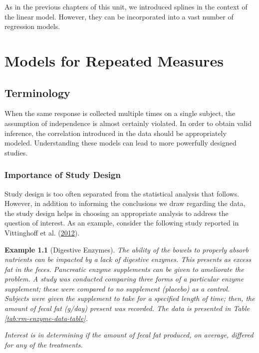 \documentclass[
]{book}
\theoremstyle{plain}
\theoremstyle{mydefn}
\theoremstyle{myexmpl}
\newtheorem{example}{Example}[chapter]
\theoremstyle{remark}
\begin{document}
As in the previous chapters of this unit, we introduced splines in the context of the linear model. However, they can be incorporated into a vast number of regression models.

\hypertarget{part-models-for-repeated-measures}{%
\part{Models for Repeated Measures}\label{part-models-for-repeated-measures}}

\hypertarget{rm-terminology}{%
\chapter{Terminology}\label{rm-terminology}}

When the same response is collected multiple times on a single subject, the assumption of independence is almost certainly violated. In order to obtain valid inference, the correlation introduced in the data should be appropriately modeled. Understanding these models can lead to more powerfully designed studies.

\hypertarget{importance-of-study-design}{%
\section{Importance of Study Design}\label{importance-of-study-design}}

Study design is too often separated from the statistical analysis that follows. However, in addition to informing the conclusions we draw regarding the data, the study design helps in choosing an appropriate analysis to address the question of interest. As an example, consider the following study reported in Vittinghoff et al. (\protect\hyperlink{ref-Vittinghoff2012}{2012}).

\begin{example}[Digestive Enzymes]
The ability of the bowels to properly absorb nutrients can be impacted by a lack of digestive enzymes. This presents as excess fat in the feces. Pancreatic enzyme supplements can be given to ameliorate the problem. A study was conducted comparing three forms of a particular enzyme supplement; these were compared to no supplement (placebo) as a control. Subjects were given the supplement to take for a specified length of time; then, the amount of fecal fat (g/day) present was recorded. The data is presented in Table \ref{tab:rm-enzyme-data-table}.

Interest is in determining if the amount of fecal fat produced, on average, differed for any of the treatments.
\end{example}
\end{document}
